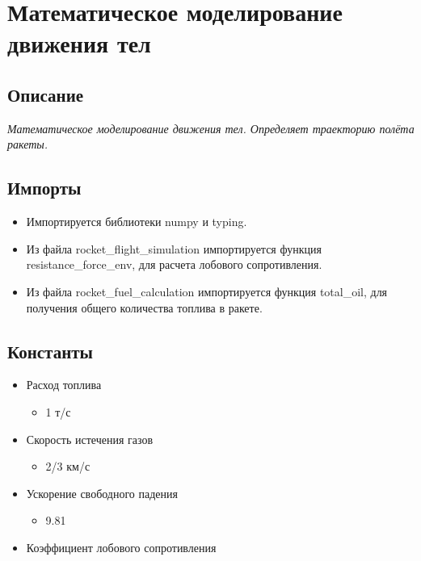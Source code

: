 \documentclass[a4paper, 12pt]{report}
\begin{document}
\chapter{Математическое моделирование движения тел}
\section{Описание}
\textit{Математическое моделирование движения тел. Определяет траекторию полёта ракеты.}
\section{Импорты}
\begin{itemize}
    \item Импортируется библиотеки numpy и typing.
    \item Из файла rocket\_flight\_simulation импортируется функция resistance\_force\_env, для расчета лобового сопротивления.
    \item Из файла rocket\_fuel\_calculation импортируется функция total\_oil, для получения общего количества топлива в ракете.
\end{itemize}
\section{Константы}
\begin{itemize}
    \item Расход топлива
    \begin{itemize}
        \item 1 т/с
    \end{itemize}
    \item Скорость истечения газов
    \begin{itemize}
        \item 2/3 км/с
    \end{itemize}
    \item Ускорение свободного падения
    \begin{itemize}
        \item 9.81
    \end{itemize}
    \item Коэффициент лобового сопротивления
    \begin{itemize}
    \end{itemize}
\end{itemize}
\end{document}
